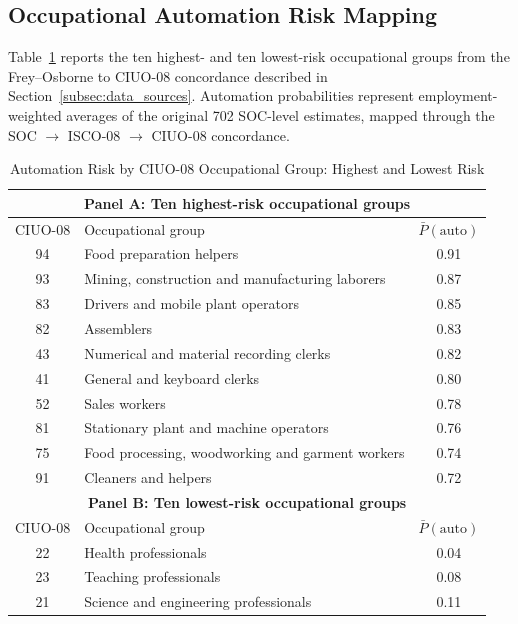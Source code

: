 \documentclass[5p,times,authoryear]{elsarticle}
\begin{document}
\subsection{Occupational Automation Risk Mapping}
\label{app:occupation_mapping}

Table~\ref{tab:occupation_mapping} reports the ten highest- and ten lowest-risk occupational groups from the Frey--Osborne to CIUO-08 concordance described in Section~\ref{subsec:data_sources}. Automation probabilities represent employment-weighted averages of the original 702 SOC-level estimates, mapped through the SOC $\to$ ISCO-08 $\to$ CIUO-08 concordance.

\begin{table}[htbp]
\centering
\begin{threeparttable}
\caption{Automation Risk by CIUO-08 Occupational Group: Highest and Lowest Risk}
\label{tab:occupation_mapping}
\small
\setlength{\tabcolsep}{5pt}
\begin{tabular}{@{}clc@{}}
\toprule
\multicolumn{3}{c}{\textbf{Panel A: Ten highest-risk occupational groups}} \\
\midrule
CIUO-08 & Occupational group & $\bar{P}(\text{auto})$ \\
\midrule
94 & Food preparation helpers & 0.91 \\
93 & Mining, construction and manufacturing laborers & 0.87 \\
83 & Drivers and mobile plant operators & 0.85 \\
82 & Assemblers & 0.83 \\
43 & Numerical and material recording clerks & 0.82 \\
41 & General and keyboard clerks & 0.80 \\
52 & Sales workers & 0.78 \\
81 & Stationary plant and machine operators & 0.76 \\
75 & Food processing, woodworking and garment workers & 0.74 \\
91 & Cleaners and helpers & 0.72 \\
\midrule
\multicolumn{3}{c}{\textbf{Panel B: Ten lowest-risk occupational groups}} \\
\midrule
CIUO-08 & Occupational group & $\bar{P}(\text{auto})$ \\
\midrule
22 & Health professionals & 0.04 \\
23 & Teaching professionals & 0.08 \\
21 & Science and engineering professionals & 0.11 \\

\end{tabular}
\end{threeparttable}
\end{table}
\end{document}
